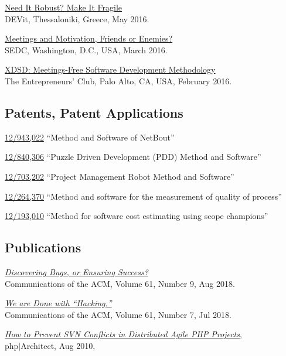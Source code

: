 \documentclass[12pt]{article}
\begin{document}
\href{https://www.youtube.com/watch?v=nCGBgI1MNwE}{Need It Robust? Make It Fragile}\\
DEVit, Thessaloniki, Greece, May 2016.

\href{https://www.youtube.com/watch?v=LB_YLWhGrco}{Meetings and Motivation, Friends or Enemies?}\\
SEDC, Washington, D.C., USA, March 2016.

\href{https://www.youtube.com/watch?v=qRZYJGYdrwk}{XDSD: Meetings-Free Software Development Methodology}\\
The Entrepreneurs' Club, Palo Alto, CA, USA, February 2016.

\subsection*{Patents, Patent Applications}

\href{https://patents.google.com/patent/US20120117164}{12/943,022}
``Method and Software of NetBout''

\href{https://patents.google.com/patent/US20120023476}{12/840,306}
``Puzzle Driven Development (PDD) Method and Software''

\href{https://patents.google.com/patent/US20110196798}{12/703,202}
``Project Management Robot Method and Software''

\href{https://patents.google.com/patent/US20100114638}{12/264,370}
``Method and software for the measurement of quality of process''

\href{https://patents.google.com/patent/US20100042968}{12/193,010}
``Method for software cost estimating using scope champions''

\subsection*{Publications}

\emph{\href{https://www.yegor256.com/pdf/2018/discovering-bugs.pdf}{Discovering Bugs, or Ensuring Success?}}\\
Communications of the ACM, Volume 61, Number 9, Aug 2018.

\emph{\href{https://www.yegor256.com/pdf/2018/we-are-done-with-hacking.pdf}{We are Done with ``Hacking,''}}\\
Communications of the ACM, Volume 61, Number 7, Jul 2018.

\emph{\href{https://www.yegor256.com/pdf/2010/phpArchitect-conflicts.pdf}{How to Prevent SVN Conflicts in Distributed Agile PHP Projects}},\\
php$|$Architect, Aug 2010,
\end{document}
